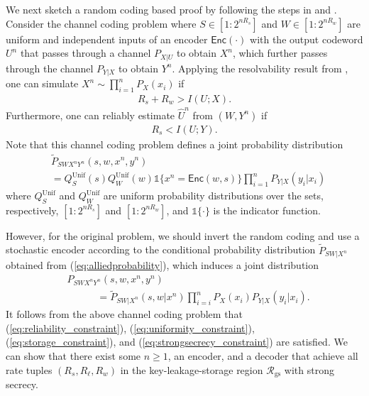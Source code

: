 \documentclass[journal,10pt,twoside]{IEEEtran}
\newcommand{\Enc}{\mathsf{Enc}}
\begin{document}
\begin{IEEEproof}We next sketch a random coding based proof by following the steps in \cite{LikelihoodEncoder} and \cite[Section 1.6.2]{BlochLectureNotes2018}. Consider the channel coding problem where $S\in[1:2^{nR_s}]$ and $W\in[1:2^{nR_w}]$ are uniform and independent inputs of an encoder $\Enc(\cdot)$ with the output codeword $U^n$ that passes through a channel $P_{X|U}$ to obtain $X^n$, which further passes through the channel $P_{Y|X}$ to obtain $Y^n$. Applying the resolvability result from \cite[Theorem 1]{GerhardDivergence}, one can simulate $X^n\sim \prod_{i=1}^nP_X(x_i)$ if 
	\begin{align}
	R_s+R_w>I(U;X).
	\end{align}
	Furthermore, one can reliably estimate $\widehat{U}^n$ from $(W,Y^n)$ if
	\begin{align}
	R_s< I(U;Y).
	\end{align} 
	Note that this channel coding problem defines a joint probability distribution 
	\begin{align}
	&\widetilde{P}_{SWX^nY^n}(s,w,x^n,y^n)\nonumber\\
	&\!=\! Q^{\text{Unif}}_S(s)Q^{\text{Unif}}_W(w)\mathds{1}\{x^n\!=\!\Enc(w,s)\}\prod_{i=1}^nP_{Y|X}(y_i|x_i) \label{eq:alliedprobability}
	\end{align}
	where $Q^{\text{Unif}}_S$ and $Q^{\text{Unif}}_W$ are uniform probability distributions over the sets, respectively, $[1:2^{nR_s}]$ and $[1:2^{nR_w}]$, and $\mathds{1}\{\cdot\}$ is the indicator function.
	
	However, for the original problem, we should invert the random coding and use a stochastic encoder according to the conditional probability distribution $\widetilde{P}_{SW|X^n}$ obtained from (\ref{eq:alliedprobability}), which induces a joint distribution
	\begin{align}
	&P_{SWX^nY^n}(s,w,x^n,y^n)\nonumber\\
	&\qquad\quad = \widetilde{P}_{SW|X^n}(s,w|x^n) \prod_{i=i}^nP_X(x_i)P_{Y|X}(y_i|x_i).
	\end{align}
	It follows from the above channel coding problem that (\ref{eq:reliability_constraint}), (\ref{eq:uniformity_constraint}), (\ref{eq:storage_constraint}), and (\ref{eq:strongsecrecy_constraint}) are satisfied. We can show that there exist some $n\geq 1$, an encoder, and a decoder that achieve all rate tuples $(R_s,R_{\ell},R_w)$ in the key-leakage-storage region $\mathcal{R}_{\text{gs}}$ with strong secrecy.
\end{IEEEproof}
\end{document}

